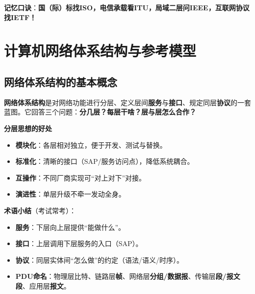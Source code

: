 \documentclass[lang=cn,newtx,10pt,scheme=chinese]{../../elegantbook}
\begin{document}
\begin{center}
\end{center}

	\textbf{记忆口诀}：\textbf{国（际）标找ISO，电信承载看ITU，局域二层问IEEE，互联网协议找IETF！}

\section{计算机网络体系结构与参考模型}

\subsection{网络体系结构的基本概念}

	\textbf{网络体系结构}是对网络功能进行分层、定义层间\textbf{服务}与\textbf{接口}、规定同层\textbf{协议}的一套蓝图。它回答三个问题：\textbf{分几层？每层干啥？层与层怎么合作？}

	\textbf{分层思想的好处}
\begin{itemize}
    \item \textbf{模块化}：各层相对独立，便于开发、测试与替换。
    \item \textbf{标准化}：清晰的接口（SAP/服务访问点），降低系统耦合。
    \item \textbf{互操作}：不同厂商实现可“对上对下”对接。
    \item \textbf{演进性}：单层升级不牵一发动全身。
\end{itemize}

	\textbf{术语小结}（考试常考）：

\begin{itemize}
    \item \textbf{服务}：下层向上层提供“能做什么”。
    \item \textbf{接口}：上层调用下层服务的入口（SAP）。
    \item \textbf{协议}：同层实体间“怎么做”的约定（语法/语义/时序）。
    \item \textbf{PDU命名}：物理层比特、链路层\textbf{帧}、网络层\textbf{分组/数据报}、传输层\textbf{段/报文段}、应用层\textbf{报文}。
\end{itemize}
\end{document}
